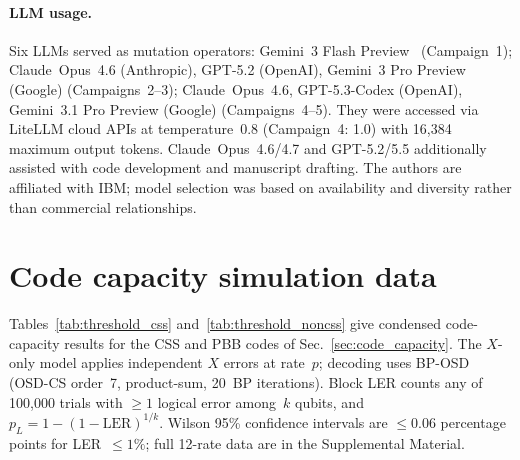 \documentclass[aps,prxquantum,twocolumn,superscriptaddress,nofootinbib]{revtex4-2}
\begin{document}
\paragraph{LLM usage.}
Six LLMs served as mutation operators: Gemini~3 Flash Preview~\cite{google2025gemini3} (Campaign~1); Claude~Opus~4.6 (Anthropic), GPT-5.2 (OpenAI), Gemini~3 Pro Preview (Google) (Campaigns~2--3); Claude~Opus~4.6, GPT-5.3-Codex (OpenAI), Gemini~3.1 Pro Preview (Google) (Campaigns~4--5).
They were accessed via LiteLLM cloud APIs at temperature~0.8 (Campaign~4: 1.0) with 16{,}384 maximum output tokens.
Claude~Opus~4.6/4.7 and GPT-5.2/5.5 additionally assisted with code development and manuscript drafting.
The authors are affiliated with IBM; model selection was based on availability and diversity rather than commercial relationships.

\appendix

\section{Code capacity simulation data}
\label{app:threshold}

Tables~\ref{tab:threshold_css} and~\ref{tab:threshold_noncss} give condensed code-capacity results for the CSS and PBB codes of Sec.~\ref{sec:code_capacity}.
The $X$-only model applies independent $X$ errors at rate~$p$; decoding uses BP-OSD (OSD-CS order~7, product-sum, 20~BP iterations).
Block LER counts any of 100{,}000 trials with $\geq 1$ logical error among~$k$ qubits, and $p_L = 1{-}(1{-}\text{LER})^{1/k}$.
Wilson 95\% confidence intervals are $\leq 0.06$ percentage points for LER~$\leq 1\%$; full 12-rate data are in the Supplemental Material.
\end{document}
